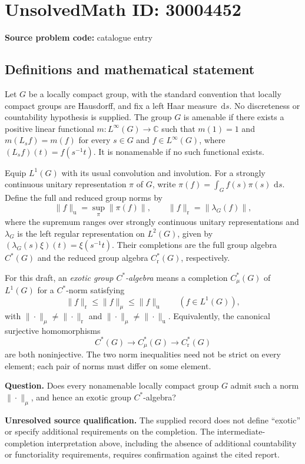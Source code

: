 \documentclass[11pt]{article}
\newcommand{\C}{\mathbb{C}}
\newcommand{\dd}{\,\mathrm{d}}
\begin{document}
\section*{UnsolvedMath ID: 30004452}
\textbf{Source problem code:} catalogue entry
\subsection{Definitions and mathematical statement}
Let \(G\) be a locally compact group, with the standard convention that locally compact groups are Hausdorff, and fix a left Haar measure \(\dd s\). No discreteness or countability hypothesis is supplied. The group \(G\) is amenable if there exists a positive linear functional \(m:L^\infty(G)\to\C\) such that \(m(1)=1\) and \(m(L_s f)=m(f)\) for every \(s\in G\) and \(f\in L^\infty(G)\), where \((L_s f)(t)=f(s^{-1}t)\). It is nonamenable if no such functional exists.

Equip \(L^1(G)\) with its usual convolution and involution. For a strongly continuous unitary representation \(\pi\) of \(G\), write \(\pi(f)=\int_G f(s)\pi(s)\,\dd s\). Define the full and reduced group norms by
\[
\|f\|_{\mathrm{u}}=\sup_{\pi}\|\pi(f)\|,
\qquad
\|f\|_{\mathrm{r}}=\|\lambda_G(f)\|,
\]
where the supremum ranges over strongly continuous unitary representations and \(\lambda_G\) is the left regular representation on \(L^2(G)\), given by \((\lambda_G(s)\xi)(t)=\xi(s^{-1}t)\). Their completions are the full group algebra \(C^*(G)\) and the reduced group algebra \(C^*_{\mathrm r}(G)\), respectively.

For this draft, an \emph{exotic group \(C^*\)-algebra} means a completion \(C^*_{\mu}(G)\) of \(L^1(G)\) for a \(C^*\)-norm satisfying
\[
\|f\|_{\mathrm r}\leq\|f\|_{\mu}\leq\|f\|_{\mathrm u}
\qquad(f\in L^1(G)),
\]
with \(\|\cdot\|_{\mu}\neq\|\cdot\|_{\mathrm r}\) and \(\|\cdot\|_{\mu}\neq\|\cdot\|_{\mathrm u}\). Equivalently, the canonical surjective homomorphisms
\[
C^*(G)\longrightarrow C^*_{\mu}(G)\longrightarrow C^*_{\mathrm r}(G)
\]
are both noninjective. The two norm inequalities need not be strict on every element; each pair of norms must differ on some element.

\textbf{Question.} Does every nonamenable locally compact group \(G\) admit such a norm \(\|\cdot\|_{\mu}\), and hence an exotic group \(C^*\)-algebra?

\textbf{Unresolved source qualification.} The supplied record does not define ``exotic'' or specify additional requirements on the completion. The intermediate-completion interpretation above, including the absence of additional countability or functoriality requirements, requires confirmation against the cited report.
\end{document}
